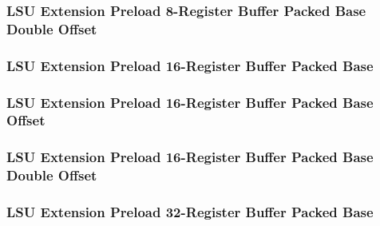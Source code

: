 \subsubsection[{\small LSU Extension Preload 8-Register Buffer Packed Base Double Offset}]{LSU Extension Preload 8-Register Buffer Packed Base Double Offset} \label{sec:format-LSU-XPL8RBB.D}



\subsubsection[{\small LSU Extension Preload 16-Register Buffer Packed Base}]{LSU Extension Preload 16-Register Buffer Packed Base} \label{sec:format-LSU-XPL16RBB}



\subsubsection[{\small LSU Extension Preload 16-Register Buffer Packed Base Offset}]{LSU Extension Preload 16-Register Buffer Packed Base Offset} \label{sec:format-LSU-XPL16RBB.O}



\subsubsection[{\small LSU Extension Preload 16-Register Buffer Packed Base Double Offset}]{LSU Extension Preload 16-Register Buffer Packed Base Double Offset} \label{sec:format-LSU-XPL16RBB.D}



\subsubsection[{\small LSU Extension Preload 32-Register Buffer Packed Base}]{LSU Extension Preload 32-Register Buffer Packed Base} \label{sec:format-LSU-XPL32RBB}

